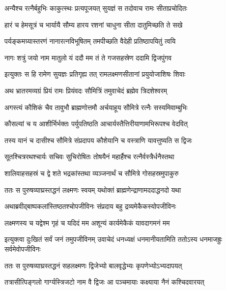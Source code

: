 \twolineshloka
{अन्यैश्च रत्नैर्बहुभिः काकुत्स्थः प्रत्यपूजयत्}
{सुयज्ञं स तदोवाच रामः सीताप्रचोदितः} %

\twolineshloka
{हारं च हेमसूत्रं च भार्यायै सौम्य हारय}
{रशनां चाधुना सीता दातुमिच्छति ते सखे} %

\twolineshloka
{पर्यङ्कमग्र्यास्तरणं नानारत्नविभूषितम्}
{तमपीच्छति वैदेही प्रतिष्ठापयितुं त्वयि} %

\twolineshloka
{नागः शत्रुं जयो नाम मातुलो यं ददौ मम}
{तं ते गजसहस्रेण ददामि द्विजपुंगव} %

\twolineshloka
{इत्युक्तः स हि रामेण सुयज्ञः प्रतिगृह्य तत्}
{रामलक्ष्मणसीतानां प्रयुयोजाशिषः शिवाः} %

\twolineshloka
{अथ भ्रातरमव्यग्रं प्रियं रामः प्रियंवदः}
{सौमित्रिं तमुवाचेदं ब्रह्मेव त्रिदशेश्वरम्} %

\twolineshloka
{अगस्त्यं कौशिकं चैव तावुभौ ब्राह्मणोत्तमौ}
{अर्चयाहूय सौमित्रे रत्नैः सस्यमिवाम्बुभिः} %

\twolineshloka
{कौसल्यां च य आशीर्भिर्भक्तः पर्युपतिष्ठति}
{आचार्यस्तैत्तिरीयाणामभिरूपश्च वेदवित्} %

\twolineshloka
{तस्य यानं च दासीश्च सौमित्रे संप्रदापय}
{कौशेयानि च वस्त्राणि यावत्तुष्यति स द्विजः} %

\twolineshloka
{सूतश्चित्ररथश्चार्यः सचिवः सुचिरोषितः}
{तोषयैनं महार्हैश्च रत्नैर्वस्त्रैर्धनैस्तथा} %

\twolineshloka
{शालिवाहसहस्रं च द्वे शते भद्रकांस्तथा}
{व्यञ्जनार्थं च सौमित्रे गोसहस्रमुपाकुरु} %

\twolineshloka
{ततः स पुरुषव्याघ्रस्तद्धनं लक्ष्मणः स्वयम्}
{यथोक्तं ब्राह्मणेन्द्राणामददाद्धनदो यथा} %

\twolineshloka
{अथाब्रवीद्बाष्पकलांस्तिष्ठतश्चोपजीविनः}
{संप्रदाय बहु द्रव्यमेकैकस्योपजीविनः} %

\twolineshloka
{लक्ष्मणस्य च यद्वेश्म गृहं च यदिदं मम}
{अशून्यं कार्यमेकैकं यावदागमनं मम} %

\threelineshloka
{इत्युक्त्वा दुःखितं सर्वं जनं तमुपजीविनम्}
{उवाचेदं धनध्यक्षं धनमानीयतामिति}
{ततोऽस्य धनमाजह्रुः सर्वमेवोपजीविनः} %

\twolineshloka
{ततः स पुरुषव्याघ्रस्तद्धनं सहलक्ष्मणः}
{द्विजेभ्यो बालवृद्धेभ्यः कृपणेभ्योऽभ्यदापयत्} %

\twolineshloka
{तत्रासीत्पिङ्गलो गार्ग्यस्त्रिजटो नाम वै द्विजः}
{आ पञ्चमायाः कक्ष्याया नैनं कश्चिदवारयत्} %

